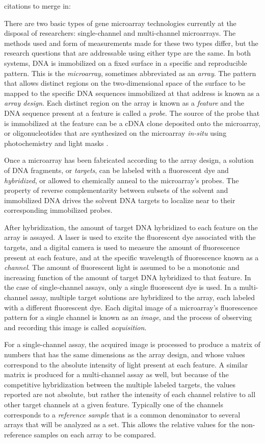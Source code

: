  citations to merge in:
\cite{wit2004,mage}

There are two basic types of gene microarray technologies currently at the
disposal of researchers: single-channel and multi-channel microarrays.  The
methods used and form of measurements made for these two types differ, but the
research questions that are addressable using either type are the same.  In
both systems, DNA is immobilized on a fixed surface in a specific and
reproducible pattern.  This is the \emph{microarray}, sometimes abbreviated as
an \emph{array}.  The pattern that allows distinct regions on the
two-dimensional space of the surface to be mapped to the specific DNA sequences
immobilized at that address is known as a \emph{array design}.  Each distinct
region on the array is known as a \emph{feature} and the DNA sequence present
at a feature is called a \emph{probe}.  The source of the probe that is
immobilized at the feature can be a cDNA clone deposited onto the microarray,
or oligonucleotides that are synthesized on the microarray \emph{in-situ} using
photochemistry and light masks \cite{XXX}.

Once a microarray has been fabricated according to the array design, a solution
of DNA fragments, or \emph{targets}, can be labeled with a fluorescent dye and
\emph{hybridized}, or allowed to chemically anneal to the microarray's probes.
The property of reverse complementarity between subsets of the solvent and
immobilized DNA drives the solvent DNA targets to localize near to their
corresponding immobilized probes.

After hybridization, the amount of target DNA hybridized to each feature on the
array is assayed.  A laser is used to excite the fluorescent dye associated
with the targets, and a digital camera is used to measure the amount of
fluorescence present at each feature, and at the specific wavelength of
fluorescence known as a \emph{channel}.  The amount of fluorescent light is
assumed to be a monotonic and increasing function of the amount of target DNA
hybridized to that feature.  In the case of single-channel assays, only a
single fluorescent dye is used.  In a multi-channel assay, multiple target
solutions are hybridized to the array, each labeled with a different
fluorescent dye.  Each digital image of a microarray's fluorescence pattern for
a single channel is known as an \emph{image}, and the process of observing and
recording this image is called \emph{acquisition}.

For a single-channel assay, the acquired image is processed to produce a matrix
of numbers that has the same dimensions as the array design, and whose values
correspond to the absolute intensity of light present at each feature.  A
similar matrix is produced for a multi-channel assay as well, but because of
the competitive hybridization between the multiple labeled targets, the values
reported are not absolute, but rather the intensity of each channel relative to
all other target channels at a given feature.  Typically one of the channels
corresponds to a \emph{reference sample} that is a common denominator to
several arrays that will be analyzed as a set.  This allows the relative values
for the non-reference samples on each array to be compared.

